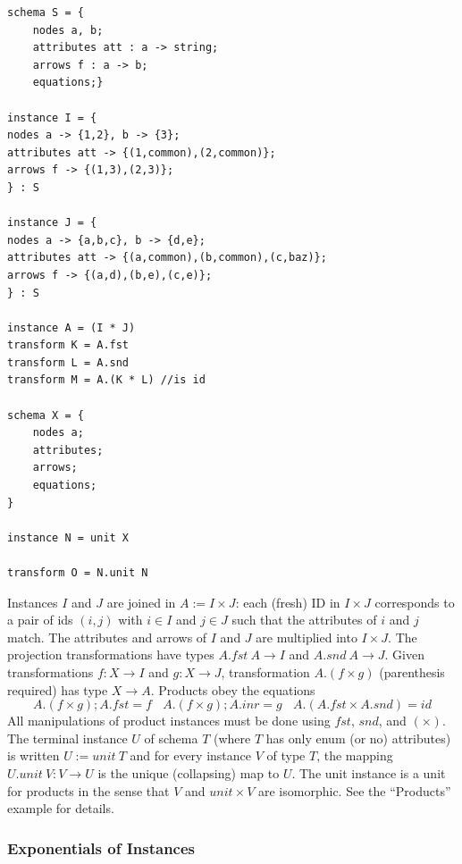 \documentclass[12pt]{article}
\begin{document}
\begin{verbatim}
schema S = {
	nodes a, b;
	attributes att : a -> string;
	arrows f : a -> b;
	equations;}

instance I = {
nodes a -> {1,2}, b -> {3};
attributes att -> {(1,common),(2,common)};
arrows f -> {(1,3),(2,3)};
} : S

instance J = {
nodes a -> {a,b,c}, b -> {d,e};
attributes att -> {(a,common),(b,common),(c,baz)};
arrows f -> {(a,d),(b,e),(c,e)};
} : S

instance A = (I * J)
transform K = A.fst
transform L = A.snd
transform M = A.(K * L) //is id

schema X = {
	nodes a;
	attributes;
	arrows;
	equations;
}

instance N = unit X

transform O = N.unit N
\end{verbatim}
Instances $I$ and $J$ are joined in $A := I \times J$: each (fresh) ID in $I\times J $ corresponds to a pair of ids $(i,j)$ with $i \in I$ and $j \in J$ such that the attributes of $i$ and $j$ match. The attributes and arrows of $I$ and $J$ are multiplied into $I\times J$.  The projection transformations have types $A.fst \ A \to I$ and $A.snd \ A \to J$.  Given transformations $f : X \to I$ and $g : X \to J$, transformation $A.(f \times g)$ (parenthesis required) has type $X \to A$.  Products obey the equations
$$
 A.(f \times g) ; A.fst = f \ \ \ \ A.(f \times g) ; A.inr = g \ \ \ \ A.(A.fst \times A.snd) = id
$$
All manipulations of product instances must be done using $fst$, $snd$, and $(\times)$.  The terminal instance $U$ of schema $T$ (where $T$ has only enum (or no) attributes) is written $U := unit \ T$ and for every instance $V$ of type $T$, the mapping $U.unit \ V : V \to U$ is the unique (collapsing) map to $U$.  The unit instance is a unit for products in the sense that $V$ and $unit \times V$ are isomorphic.  See the ``Products'' example for details.
 
\subsubsection{Exponentials of Instances}
\end{document}
